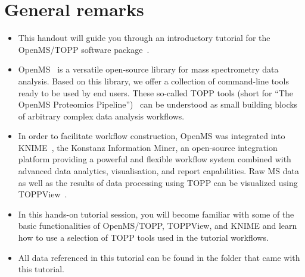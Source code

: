 \documentclass[12pt]{myNotes}
\begin{document}

\firstpages


\setcounter{equation}{0}
\section{General remarks}
\label{General remarks}

\begin{itemize}
\item This handout will guide you through an introductory tutorial for the OpenMS/TOPP software package~\cite{OpenMS}.
\item OpenMS~\cite{Sturm2008} is a versatile open-source library for mass spectrometry data analysis. Based on this library, we offer a collection
      of command-line tools ready to be used by end users. These so-called TOPP tools (short for ``The OpenMS Proteomics Pipeline'')~\cite{Kohlbacher2007} can be understood as
      small building blocks of arbitrary complex data analysis workflows.
\item In order to facilitate workflow construction, OpenMS was integrated into KNIME~\cite{KNIME}, the Konstanz
			Information Miner, an open-source integration platform providing a powerful and flexible workflow system
			combined with advanced data analytics, visualisation, and report capabilities. Raw MS data as well as the
			results of data processing using TOPP can be visualized using TOPPView~\cite{Sturm2009}.
\item In this hands-on tutorial session, you will become familiar with some of the basic functionalities of OpenMS/TOPP, TOPPView, and KNIME
      and learn how to use a selection of TOPP tools used in the tutorial workflows.
\item All data referenced in this tutorial can be found in the  folder that came with this tutorial.
\end{itemize}











%




\end{document}
